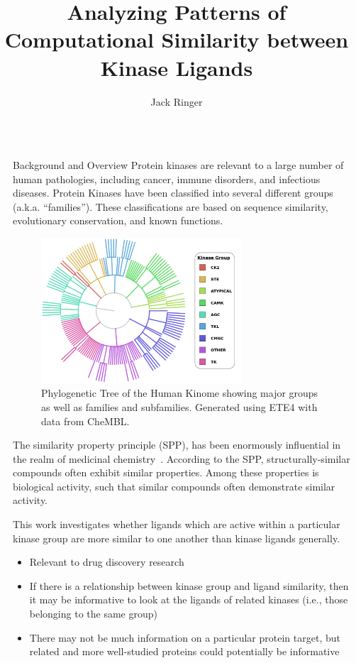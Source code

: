 \documentclass[final]{beamer}
\title{Analyzing Patterns of Computational Similarity between Kinase Ligands}
\author{Jack Ringer}
\institute[shortinst]{University of New Mexico}
\newlength{\sepwidth}
\newlength{\colwidth}
\newcommand{\separatorcolumn}{\begin{column}{\sepwidth}\end{column}}
\begin{document}
\begin{frame}[t]
\begin{columns}[t]
\separatorcolumn

\begin{column}{\colwidth}

  \begin{block}{Background and Overview}
   \small
   Protein kinases are relevant to a large number of human pathologies, including cancer, immune disorders, and infectious diseases. Protein Kinases have been classified into several different groups (a.k.a. ``families''). These classifications are based on sequence similarity, evolutionary conservation, and known functions. 


\begin{figure}
    \centering
    \includegraphics[width=0.7\textwidth]{../figures/protein_family_tree.png}
    \caption{Phylogenetic Tree of the Human Kinome showing major groups as well as families and subfamilies. Generated using ETE4 with data from CheMBL.}
    \label{fam_tree}
\end{figure}

The similarity property principle (SPP), has been enormously influential in the realm of medicinal chemistry~\cite{maggiora_vogt_stumpfe_bajorath_2013}. According to the SPP, structurally-similar compounds often exhibit similar properties. Among these properties is biological activity, such that similar compounds often demonstrate similar activity. 

This work investigates whether ligands which are active within a particular kinase group are more similar to one another than kinase ligands generally. 
    \begin{itemize}
        \item Relevant to drug discovery research
        \item If there is a relationship between kinase group and ligand similarity, then it may be informative to look at the ligands of related kinases (i.e., those belonging to the same group)
        \item There may not be much information on a particular protein target, but related and more well-studied proteins could potentially be informative
    \end{itemize}


\end{block}
\end{column}
\end{columns}
\end{frame}
\end{document}
